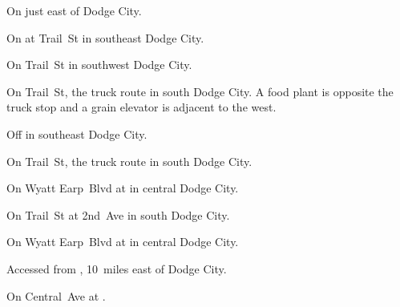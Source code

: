

\begin{LocationList}

On  just east of Dodge City.

On  at Trail~St in southeast Dodge City.

On Trail~St in southwest Dodge City.

On Trail~St, the truck route in south Dodge City.
A food plant is opposite the truck stop and a grain elevator is adjacent to the west.

Off  in southeast Dodge City.

On Trail~St, the truck route in south Dodge City.

On Wyatt Earp~Blvd at   in central Dodge City.

On Trail~St at 2nd~Ave in south Dodge City.

\Location{\TruckStop \Gas \Rest}
On Wyatt Earp~Blvd at   in central Dodge City.

Accessed from , 10~miles east of Dodge City.

On Central~Ave at .

\end{LocationList}
